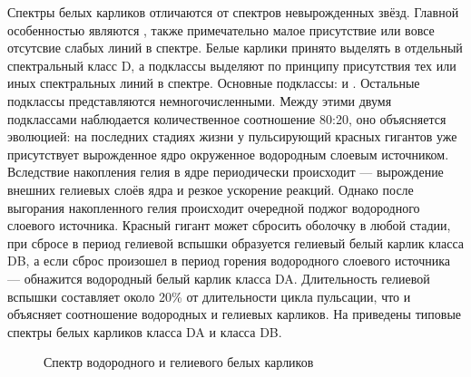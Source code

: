 Спектры белых карликов отличаются от спектров невырожденных звёзд. Главной особенностью являются , также примечательно малое присутствие или вовсе отсутсвие слабых линий в спектре. Белые карлики принято выделять в отдельный спектральный класс D, а подклассы выделяют по принципу присутствия тех или иных спектральных линий в спектре. Основные подклассы:  и . Остальные подклассы представляются немногочисленными. Между этими двумя подклассами наблюдается количественное соотношение 80:20, оно объясняется эволюцией: на последних стадиях жизни у пульсирующий красных гигантов уже присутствует вырожденное ядро окруженное водородным слоевым источником. Вследствие накопления гелия в ядре периодически происходит  — вырождение внешних гелиевых слоёв ядра и резкое ускорение реакций. Однако после выгорания накопленного гелия происходит очередной поджог водородного слоевого источника. Красный гигант может сбросить оболочку в любой стадии, при сбросе в период гелиевой вспышки образуется гелиевый белый карлик класса DB, а если сброс произошел в период горения водородного слоевого источника — обнажится водородный белый карлик класса DA. Длительность гелиевой вспышки составляет около 20\% от длительности цикла пульсации, что и объясняет соотношение водородных и гелиевых карликов. На  приведены типовые спектры белых карликов класса DA и класса DB.


\begin{figure}[h!]
    \centering
    \caption{Спектр водородного и гелиевого белых карликов}
    \label{pic:spectrum-wd}
\end{figure}




